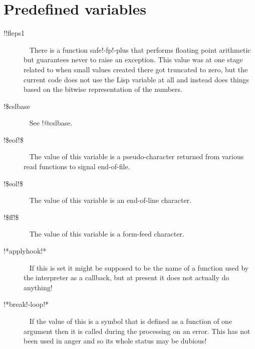 \documentclass[a4paper,11pt]{article}
\begin{document}
\section{Predefined variables}
\begin{description}

\item [{\ttfamily !!fleps1}]  ~\newline
There is a function safe!-fp!-plus that performs floating point
arithmetic but guarantees never to raise an exception. This value was
at one stage related to when small values created there got truncated to zero,
but the current code does not use the Lisp variable at all and instead does
things based on the bitwise representation of the numbers.

\item [{\ttfamily !\$cslbase}]  ~\newline
See {\ttfamily !@cslbase}.

\item [{\ttfamily !\$eof!\$}]  ~\newline
The value of this variable is a pseudo-character returned from various
read functions to signal end-of-file.

\item [{\ttfamily !\$eol!\$}] ~\newline
The value of this variable is an end-of-line character.

\item [{\ttfamily !\$ff!\$}]  ~\newline
The value of this variable is a form-feed character.

\item [{\ttfamily !*applyhook!*}]  ~\newline
If this is set it might be supposed to be the name of a function used
by the interpreter as a callback, but at present it does not actually do
anything!

\item [{\ttfamily !*break!-loop!*}]  ~\newline
If the value of this is a symbol that is defined as a function of one
argument then it is called during the processing on an error. This has not
been used in anger and so its whole status may be dubious!


\end{description}
\end{document}
